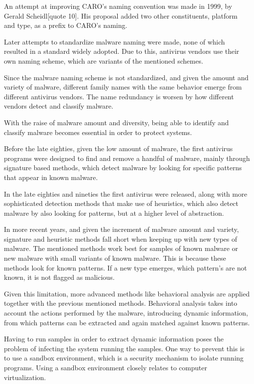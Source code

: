 \documentclass{llncs}
\begin{document}
An attempt at improving CARO's naming convention was made in 1999, by Gerald Scheidl[quote 10]. His proposal added two other constituents, platform and type, as a prefix to CARO's naming.

Later attempts to standardize malware naming were made, none of which resulted in a standard widely adopted. Due to this, antivirus vendors use their own naming scheme, which are variants of the mentioned schemes.

Since the malware naming scheme is not standardized, and given the amount and variety of malware, different family names with the same behavior emerge from different antivirus vendors. The name redundancy is worsen by how different vendors detect and classify malware.

With the raise of malware amount and diversity, being able to identify and classify malware becomes essential in order to protect systems.

Before the late eighties, given the low amount of malware, the first antivirus programs were designed to find and remove a handful of malware, mainly through signature based methods, which detect malware by looking for specific patterns that appear in known malware.

In the late eighties and nineties the first antivirus were released, along with more sophisticated detection methods that make use of heuristics, which also detect malware by also looking for patterns, but at a higher level of abstraction.

In more recent years, and given the increment of malware amount and variety, signature and heuristic methods fall short when keeping up with new types of malware. The mentioned methods work best for samples of known malware or new malware with small variants of known malware. This is because these methods look for known patterns. If a new type emerges, which pattern's are not known, it is not flagged as malicious.

Given this limitation, more advanced methods like behavioral analysis are applied together with the previous mentioned methods. Behavioral analysis takes into account the actions performed by the malware, introducing dynamic information, from which patterns can be extracted and again matched against known patterns.

Having to run samples in order to extract dynamic information poses the problem of infecting the system running the samples. One way to prevent this is to use a sandbox environment, which is a security mechanism to isolate running programs. Using a sandbox environment closely relates to computer virtualization.
\end{document}

